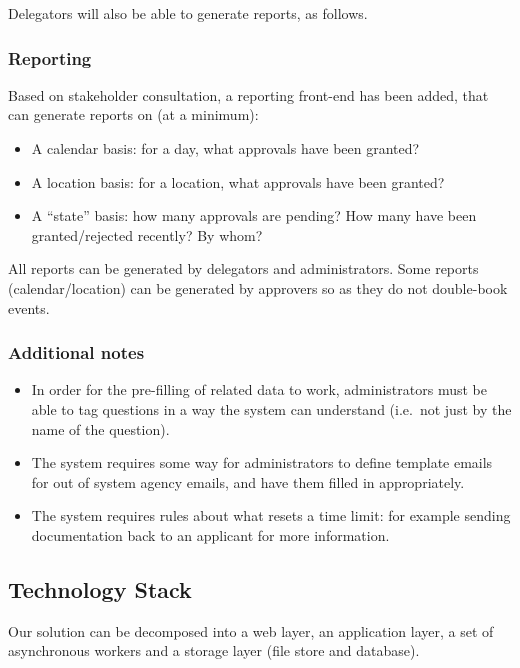 \documentclass[12pt,a4paper,twosided]{article}
\begin{document}
Delegators will also be able to generate reports, as follows.

\subsubsection{Reporting}\label{reporting}

Based on stakeholder consultation, a reporting front-end has been added,
that can generate reports on (at a minimum):

\begin{itemize}
\itemsep1pt\parskip0pt
\item
  A calendar basis: for a day, what approvals have been granted?
\item
  A location basis: for a location, what approvals have been granted?
\item
  A ``state'' basis: how many approvals are pending? How many have been
  granted/rejected recently? By whom?
\end{itemize}

All reports can be generated by delegators and administrators. Some
reports (calendar/location) can be generated by approvers so as they do
not double-book events.

\subsubsection{Additional notes}\label{additional-notes}

\begin{itemize}
\item
  In order for the pre-filling of related data to work, administrators
  must be able to tag questions in a way the system can understand
  (i.e.~not just by the name of the question).
\item
  The system requires some way for administrators to define template
  emails for out of system agency emails, and have them filled in
  appropriately.
\item
  The system requires rules about what resets a time limit: for example
  sending documentation back to an applicant for more information.
\end{itemize}

\subsection{Technology Stack}\label{technology-stack}

Our solution can be decomposed into a web layer, an application layer, a
set of asynchronous workers and a storage layer (file store and
database).
\end{document}
